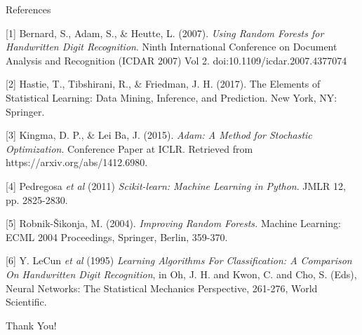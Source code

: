\documentclass[titlepage,leqno]{beamer}%
\begin{document}
\begin{frame}[fragile]{References}

\tiny

[1] Bernard, S., Adam, S., \& Heutte, L. (2007). \textit{Using Random Forests for Handwritten Digit Recognition}. Ninth International Conference on Document Analysis and Recognition (ICDAR 2007) Vol 2. doi:10.1109/icdar.2007.4377074

\vspace{3mm}

[2] Hastie, T., Tibshirani, R., \& Friedman, J. H. (2017). The Elements of Statistical Learning: Data Mining, Inference, and Prediction. New York, NY: Springer.

\vspace{3mm}

[3] Kingma, D. P., \& Lei Ba, J. (2015).
\textit{Adam: A Method for Stochastic Optimization}. Conference Paper at ICLR. Retrieved from https://arxiv.org/abs/1412.6980.

\vspace{3mm}

[4] Pedregosa \textit{et al} (2011) \textit{Scikit-learn: Machine Learning in Python}. JMLR 12, pp. 2825-2830.

\vspace{3mm}

[5] Robnik-Šikonja, M. (2004). \textit{Improving Random Forests.} Machine Learning: ECML 2004 Proceedings, Springer, Berlin, 359-370.

\vspace{3mm}

[6] Y. LeCun \textit{et al} (1995) \textit{Learning Algorithms For Classification: A Comparison On Handwritten Digit Recognition}, in Oh, J. H. and Kwon, C. and Cho, S. (Eds), Neural Networks: The Statistical Mechanics Perspective, 261-276, World Scientific.

\end{frame}
\begin{frame}
	\begin{center}
	\begingroup
	\huge
	Thank You!\\
	\endgroup
	\end{center}
\end{frame}
\end{document}
